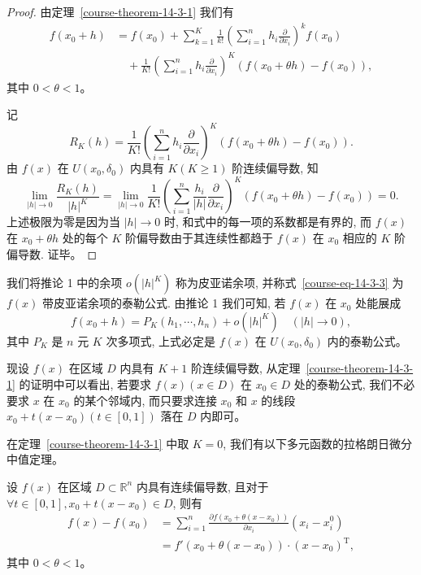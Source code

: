 \documentclass[12pt,fontset=fandol]{ctexart}
\begin{document}
\begin{proof}\quad 由定理~\ref{course-theorem-14-3-1}  我们有
\[
\begin{aligned}
  f(x_0+h)
  &=f(x_0)+\sum_{k=1}^K\frac1{k!}
  \left(\sum_{i=1}^n h_i\frac{\partial}{\partial x_i}\right)^kf(x_0)\\
  &\quad+\frac1{K!}
  \left(\sum_{i=1}^n h_i\frac{\partial}{\partial x_i}\right)^K
  (f(x_0+\theta h)-f(x_0)),
\end{aligned}
\]
其中 $0<\theta<1$。

记
\[
  R_K(h)=\frac1{K!}
  \left(\sum_{i=1}^n h_i\frac{\partial}{\partial x_i}\right)^K
  (f(x_0+\theta h)-f(x_0)).
\]
由 $f(x)$ 在 $U(x_0,\delta_0)$ 内具有 $K(K\geqslant1)$ 阶连续偏导数, 知
\[
  \lim_{|h|\to0}\frac{R_K(h)}{|h|^K}
  =\lim_{|h|\to0}\frac1{K!}
  \left(\sum_{i=1}^n\frac{h_i}{|h|}\frac{\partial}{\partial x_i}\right)^K
  (f(x_0+\theta h)-f(x_0))=0.
\]
上述极限为零是因为当 $|h|\to0$ 时, 和式中的每一项的系数都是有界的, 而 $f(x)$ 在 $x_0+\theta h$ 处的每个 $K$ 阶偏导数由于其连续性都趋于 $f(x)$ 在 $x_0$ 相应的 $K$ 阶偏导数. 证毕。

\end{proof}
\begin{remark}\quad 我们将推论 1 中的余项 $o(|h|^K)$ 称为皮亚诺余项, 并称式~\eqref{course-eq-14-3-3}  为 $f(x)$ 带皮亚诺余项的泰勒公式. 由推论 1 我们可知, 若 $f(x)$ 在 $x_0$ 处能展成
\[
  f(x_0+h)=P_K(h_1,\cdots,h_n)+o(|h|^K)
  \quad(|h|\to0),
\]
其中 $P_K$ 是 $n$ 元 $K$ 次多项式, 上式必定是 $f(x)$ 在 $U(x_0,\delta_0)$ 内的泰勒公式。

现设 $f(x)$ 在区域 $D$ 内具有 $K+1$ 阶连续偏导数, 从定理~\ref{course-theorem-14-3-1}  的证明中可以看出, 若要求 $f(x)(x\in D)$ 在 $x_0\in D$ 处的泰勒公式, 我们不必要求 $x$ 在 $x_0$ 的某个邻域内, 而只要求连接 $x_0$ 和 $x$ 的线段 $x_0+t(x-x_0)(t\in[0,1])$ 落在 $D$ 内即可。

在定理~\ref{course-theorem-14-3-1}  中取 $K=0$, 我们有以下多元函数的拉格朗日微分中值定理。

\end{remark}
\noindent{}\quad 设 $f(x)$ 在区域 $D\subset\mathbb R^n$ 内具有连续偏导数, 且对于 $\forall t\in[0,1],x_0+t(x-x_0)\in D$, 则有
\[
\begin{aligned}
  f(x)-f(x_0)
  &=\sum_{i=1}^n
  \frac{\partial f(x_0+\theta(x-x_0))}{\partial x_i}(x_i-x_i^0)\\
  &=f'(x_0+\theta(x-x_0))\cdot(x-x_0)^\mathrm T,
\end{aligned}
\]
其中 $0<\theta<1$。
\end{document}
